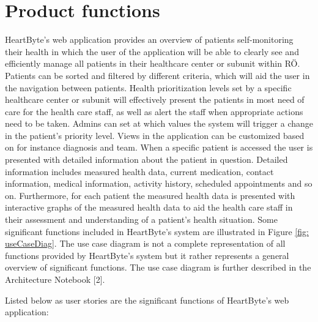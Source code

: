 \documentclass{scrreprt}
\begin{document}
\section{Product functions} 
HeartByte’s web application provides an overview of patients self-monitoring their health in which the user of the application will be able to clearly see and efficiently manage all patients in their healthcare center or subunit within RÖ. Patients can be sorted and filtered by different criteria, which will aid the user in the navigation between patients. Health prioritization levels set by a specific healthcare center or subunit will effectively present the patients in most need of care for the health care staff, as well as alert the staff when appropriate actions need to be taken. Admins can set at which values the system will trigger a change in the patient’s priority level. Views in the application can be customized based on for instance diagnosis and team. When a specific patient is accessed the user is presented with detailed information about the patient in question. Detailed information includes measured health data, current medication, contact information, medical information, activity history, scheduled appointments and so on. Furthermore, for each patient the measured health data is presented with interactive graphs of the measured health data to aid the health care staff in their assessment and understanding of a patient’s health situation. 
\newline
\newline
Some significant functions included in HeartByte’s system are illustrated in Figure \ref{fig: useCaseDiag}. The use case diagram is not a complete representation of all functions provided by HeartByte’s system but it rather represents a general overview of significant functions. The use case diagram is further described in the Architecture Notebook [2].

Listed below as user stories are the significant functions of HeartByte’s web application:

\end{document}
